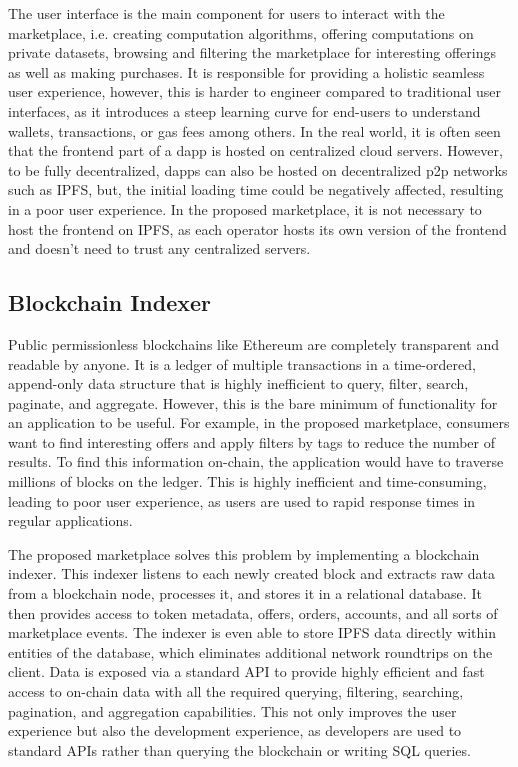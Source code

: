 The user interface is the main component for users to interact with the marketplace, i.e. creating computation algorithms, offering computations on private datasets, browsing and filtering the marketplace for interesting offerings as well as making purchases. It is responsible for providing a holistic seamless user experience, however, this is harder to engineer compared to traditional user interfaces, as it introduces a steep learning curve for end-users to understand wallets, transactions, or gas fees among others. In the real world, it is often seen that the frontend part of a \acrshort{dapp} is hosted on centralized cloud servers. However, to be fully decentralized, \acrshort{dapp}s can also be hosted on decentralized \acrshort{p2p} networks such as IPFS, but, the initial loading time could be negatively affected, resulting in a poor user experience. In the proposed marketplace, it is not necessary to host the frontend on IPFS, as each operator hosts its own version of the frontend and doesn't need to trust any centralized servers. %
            
\subsection{Blockchain Indexer}
\label{subsec:indexer}

Public permissionless blockchains like Ethereum are completely transparent and readable by anyone. It is a ledger of multiple transactions in a time-ordered, append-only data structure that is highly inefficient to query, filter, search, paginate, and aggregate. However, this is the bare minimum of functionality for an application to be useful. For example, in the proposed marketplace, consumers want to find interesting offers and apply filters by tags to reduce the number of results. To find this information on-chain, the application would have to traverse millions of blocks on the ledger. This is highly inefficient and time-consuming, leading to poor user experience, as users are used to rapid response times in regular applications.

The proposed marketplace solves this problem by implementing a blockchain indexer. This indexer listens to each newly created block and extracts raw data from a blockchain node, processes it, and stores it in a relational database. It then provides access to token metadata, offers, orders, accounts, and all sorts of marketplace events. The indexer is even able to store IPFS data directly within entities of the database, which eliminates additional network roundtrips on the client. Data is exposed via a standard API to provide highly efficient and fast access to on-chain data with all the required querying, filtering, searching, pagination, and aggregation capabilities. This not only improves the user experience but also the development experience, as developers are used to standard APIs rather than querying the blockchain or writing SQL queries.

